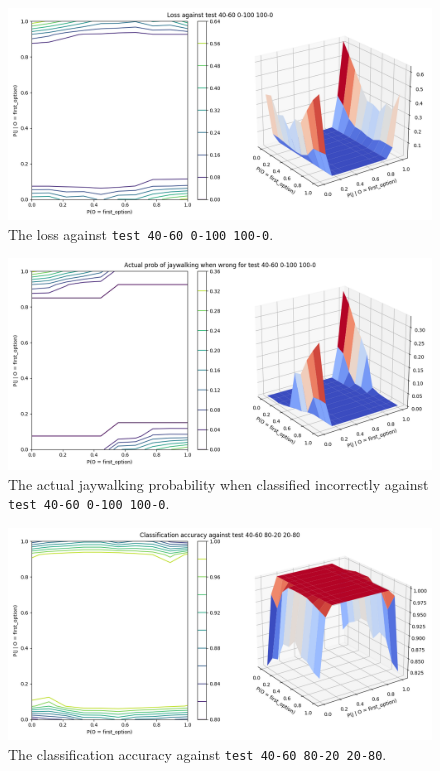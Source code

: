 \documentclass{report}
\newcommand{\code}{\texttt}
\begin{document}
\begin{figure}[h]
    \centering
    \includegraphics[width=\textwidth]{test_40-60_0-100_100-0_loss.png}
    \caption[]{The loss against \code{test 40-60 0-100 100-0}.}
    \label{fig:test_40-60_0-100_100-0_loss_plot}
\end{figure}

\begin{figure}[h]
    \centering
    \includegraphics[width=\textwidth]{test_40-60_0-100_100-0_jay_prob.png}
    \caption[]{The actual jaywalking probability when classified incorrectly against \code{test 40-60 0-100 100-0}.}
    \label{fig:test_40-60_0-100_100-0_jay_prob_plot}
\end{figure}

% 
% 

\begin{figure}[h]
    \centering
    \includegraphics[width=\textwidth]{test_40-60_80-20_20-80_accuracy.png}
    \caption[]{The classification accuracy against \code{test 40-60 80-20 20-80}.}
    \label{fig:test_40-60_80-20_20-80_accuracy_plot}
\end{figure}
\end{document}
